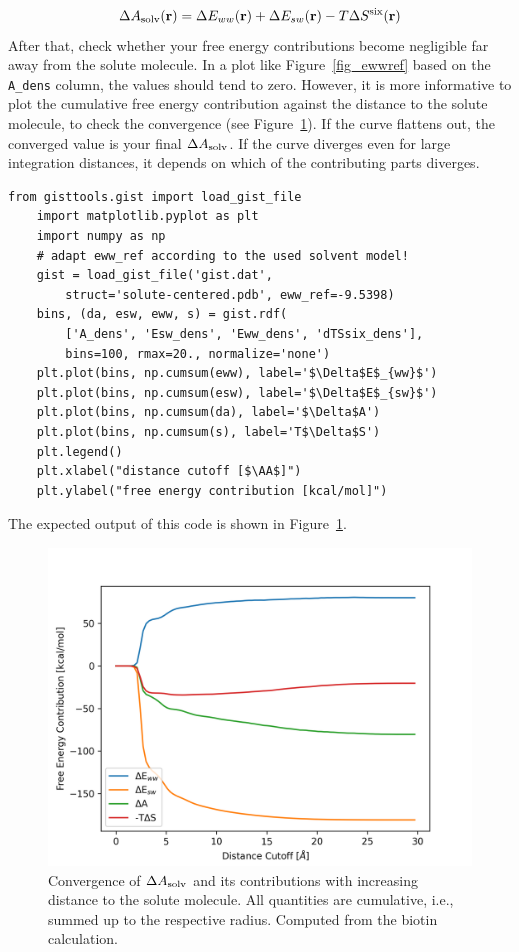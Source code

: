 \documentclass[9pt,tutorial]{livecoms}
\newcommand{\dasolv}{\Delta A_\textup{solv}}
\newcommand{\software}{\texttt}
\newcommand\inlinecode{\texttt}
\begin{document}
\newcommand{\coordinate}{\mathbf{r}}
\begin{equation}
	\dasolv(\coordinate) = \Delta E_{ww}(\coordinate) + \Delta E_{sw}(\coordinate) - T\Delta S^\text{six}(\coordinate)
\end{equation}
After that, check whether your free energy contributions become negligible far away from the solute molecule.
In a plot like Figure~\ref{fig_ewwref} based on the \inlinecode{A\_dens} column, the values should tend to zero.
However, it is more informative to plot the cumulative free energy contribution against the distance to the solute molecule, to check the convergence (see Figure~\ref{fig_radial_convergence}).
If the curve flattens out, the converged value is your final $\dasolv$\@.
If the curve diverges even for large integration distances, it depends on which of the contributing parts diverges. 
\begin{lstlisting}[style=python]
	from gisttools.gist import load_gist_file
	import matplotlib.pyplot as plt
	import numpy as np
	# adapt eww_ref according to the used solvent model! 
	gist = load_gist_file('gist.dat',
		struct='solute-centered.pdb', eww_ref=-9.5398)
	bins, (da, esw, eww, s) = gist.rdf(
		['A_dens', 'Esw_dens', 'Eww_dens', 'dTSsix_dens'],
		bins=100, rmax=20., normalize='none')
	plt.plot(bins, np.cumsum(eww), label='$\Delta$E$_{ww}$')
	plt.plot(bins, np.cumsum(esw), label='$\Delta$E$_{sw}$')
	plt.plot(bins, np.cumsum(da), label='$\Delta$A')
	plt.plot(bins, np.cumsum(s), label='T$\Delta$S')
	plt.legend()
	plt.xlabel("distance cutoff [$\AA$]")
	plt.ylabel("free energy contribution [kcal/mol]")
	\end{lstlisting}
The expected output of this code is shown in Figure~\ref{fig_radial_convergence}.
\begin{figure}
	\centering
	\includegraphics[width=0.8\linewidth]{figures/biotin-contributions_noref.png}
	\caption{Convergence of $\dasolv$ and its contributions with increasing distance to the solute molecule. All quantities are cumulative, i.e., summed up to the respective radius. Computed from the biotin calculation.}\label{fig_radial_convergence}
\end{figure}
\end{document}
